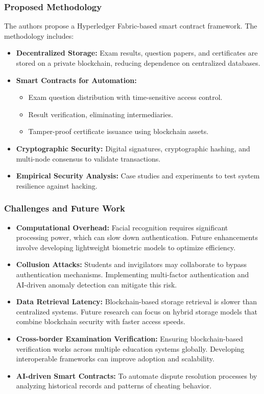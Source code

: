 \documentclass[12pt,a4paper]{article}
\begin{document}
\subsubsection{Proposed Methodology}
The authors propose a Hyperledger Fabric-based smart contract framework. The methodology includes:
\begin{itemize}
    \item \textbf{Decentralized Storage:} Exam results, question papers, and certificates are stored on a private blockchain, reducing dependence on centralized databases.
    \item \textbf{Smart Contracts for Automation:}
    \begin{itemize}
        \item Exam question distribution with time-sensitive access control.
        \item Result verification, eliminating intermediaries.
        \item Tamper-proof certificate issuance using blockchain assets.
    \end{itemize}
    \item \textbf{Cryptographic Security:} Digital signatures, cryptographic hashing, and multi-node consensus to validate transactions.
    \item \textbf{Empirical Security Analysis:} Case studies and experiments to test system resilience against hacking.
\end{itemize}

\subsubsection{Challenges and Future Work}
\begin{itemize}
    \item \textbf{Computational Overhead:} Facial recognition requires significant processing power, which can slow down authentication. Future enhancements involve developing lightweight biometric models to optimize efficiency.
    \item \textbf{Collusion Attacks:} Students and invigilators may collaborate to bypass authentication mechanisms. Implementing multi-factor authentication and AI-driven anomaly detection can mitigate this risk.
    \item \textbf{Data Retrieval Latency:} Blockchain-based storage retrieval is slower than centralized systems. Future research can focus on hybrid storage models that combine blockchain security with faster access speeds.
    \item \textbf{Cross-border Examination Verification:} Ensuring blockchain-based verification works across multiple education systems globally. Developing interoperable frameworks can improve adoption and scalability.
    \item \textbf{AI-driven Smart Contracts:} To automate dispute resolution processes by analyzing historical records and patterns of cheating behavior.
\end{itemize}
\end{document}
